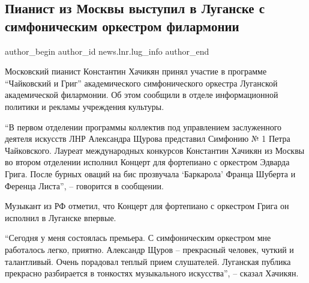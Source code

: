  
 
 
 
 
 
\subsection{Пианист из Москвы выступил в Луганске с симфоническим оркестром филармонии}
\label{sec:22_01_2022.stz.news.lnr.lug_info.1.koncert_muzykant_iz_moskvy_filarmonia}
 
\ifcmt
 author_begin
   author_id news.lnr.lug_info
 author_end
\fi

Московский пианист Константин Хачикян принял участие в программе \enquote{Чайковский и
Григ} академического симфонического оркестра Луганской академической
филармонии. Об этом сообщили в отделе информационной политики и рекламы
учреждения культуры.


\enquote{В первом отделении программы коллектив под управлением заслуженного деятеля
искусств ЛНР Александра Щурова представил Симфонию № 1 Петра Чайковского.
Лауреат международных конкурсов Константин Хачикян из Москвы во втором
отделении исполнил Концерт для фортепиано с оркестром Эдварда Грига. После
бурных оваций на бис прозвучала \enquote{Баркарола} Франца Шуберта и Ференца Листа}, –
говорится в сообщении.


Музыкант из РФ отметил, что Концерт для фортепиано с оркестром Грига он
исполнил в Луганске впервые.

\enquote{Сегодня у меня состоялась премьера. С симфоническим оркестром мне работалось
легко, приятно. Александр Щуров – прекрасный человек, чуткий и талантливый.
Очень порадовал теплый прием слушателей. Луганская публика прекрасно
разбирается в тонкостях музыкального искусства}, – сказал Хачикян.

